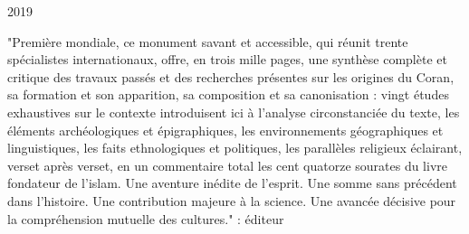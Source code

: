 2019

 "Première mondiale, ce monument savant et accessible, qui réunit trente spécialistes internationaux, offre, en trois mille pages, une synthèse complète et critique des travaux passés et des recherches présentes sur les origines du Coran, sa formation et son apparition, sa composition et sa canonisation : vingt études exhaustives sur le contexte introduisent ici à l'analyse circonstanciée du texte, les éléments archéologiques et épigraphiques, les environnements géographiques et linguistiques, les faits ethnologiques et politiques, les parallèles religieux éclairant, verset après verset, en un commentaire total les cent quatorze sourates du livre fondateur de l'islam. Une aventure inédite de l'esprit. Une somme sans précédent dans l'histoire. Une contribution majeure à la science. Une avancée décisive pour la compréhension mutuelle des cultures." : éditeur

